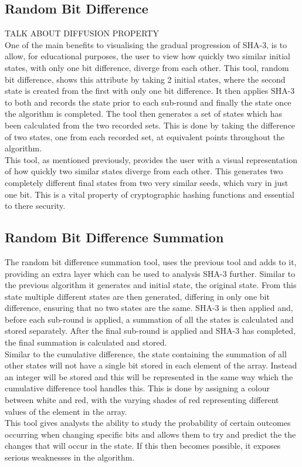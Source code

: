 \subsection{Random Bit Difference}
TALK ABOUT DIFFUSION PROPERTY
\vspace{5 mm}\\
One of the main benefits to visualising the gradual progression of SHA-3, is to allow, for educational purposes, the user to view how quickly two similar initial states, with only one bit difference, diverge from each other. This tool, random bit difference, shows this attribute by taking 2 initial states, where the second state is created from the first with only one bit difference. It then applies SHA-3 to both and records the state prior to each sub-round and finally the state once the algorithm is completed. The tool then generates a set of states which has been calculated from the two recorded sets. This is done by taking the difference of two states, one from each recorded set, at equivalent points throughout the algorithm.
\vspace{5 mm}\\
This tool, as mentioned previously, provides the user with a visual representation of how quickly two similar states diverge from each other. This generates two completely different final states from two very similar seeds, which vary in just one bit. This is a vital property of cryptographic hashing functions and essential to there security. 
\subsection{Random Bit Difference Summation}
The random bit difference summation tool, uses the previous tool and adds to it, providing an extra layer which can be used to analysis SHA-3 further. Similar to the previous algorithm it generates and initial state, the original state. From this state multiple different states are then generated, differing in only one bit difference, ensuring that no two states are the same. SHA-3 is then applied and, before each sub-round is applied, a summation of all the states is calculated and stored separately. After the final sub-round is applied and SHA-3 has completed, the final summation is calculated and stored. 
\vspace{5 mm}\\
Similar to the cumulative difference, the state containing the summation of all other states will not have a single bit stored in each element of the array. Instead an integer will be stored and this will be represented in the same way which the cumulative difference tool handles this. This is done by assigning a colour between white and red, with the varying shades of red representing different values of the element in the array.
\vspace{5 mm}\\
This tool gives analysts the ability to study the probability of certain outcomes occurring when changing specific bits and allows them to try and predict the the changes that will occur in the state. If this then becomes possible, it exposes serious weaknesses in the algorithm.
